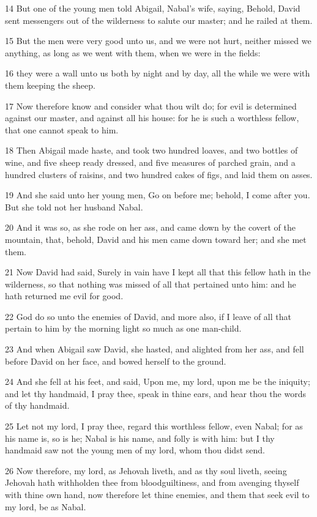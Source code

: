 \par 14 But one of the young men told Abigail, Nabal's wife, saying, Behold, David sent messengers out of the wilderness to salute our master; and he railed at them.
\par 15 But the men were very good unto us, and we were not hurt, neither missed we anything, as long as we went with them, when we were in the fields:
\par 16 they were a wall unto us both by night and by day, all the while we were with them keeping the sheep.
\par 17 Now therefore know and consider what thou wilt do; for evil is determined against our master, and against all his house: for he is such a worthless fellow, that one cannot speak to him.
\par 18 Then Abigail made haste, and took two hundred loaves, and two bottles of wine, and five sheep ready dressed, and five measures of parched grain, and a hundred clusters of raisins, and two hundred cakes of figs, and laid them on asses.
\par 19 And she said unto her young men, Go on before me; behold, I come after you. But she told not her husband Nabal.
\par 20 And it was so, as she rode on her ass, and came down by the covert of the mountain, that, behold, David and his men came down toward her; and she met them.
\par 21 Now David had said, Surely in vain have I kept all that this fellow hath in the wilderness, so that nothing was missed of all that pertained unto him: and he hath returned me evil for good.
\par 22 God do so unto the enemies of David, and more also, if I leave of all that pertain to him by the morning light so much as one man-child.
\par 23 And when Abigail saw David, she hasted, and alighted from her ass, and fell before David on her face, and bowed herself to the ground.
\par 24 And she fell at his feet, and said, Upon me, my lord, upon me be the iniquity; and let thy handmaid, I pray thee, speak in thine ears, and hear thou the words of thy handmaid.
\par 25 Let not my lord, I pray thee, regard this worthless fellow, even Nabal; for as his name is, so is he; Nabal is his name, and folly is with him: but I thy handmaid saw not the young men of my lord, whom thou didst send.
\par 26 Now therefore, my lord, as Jehovah liveth, and as thy soul liveth, seeing Jehovah hath withholden thee from bloodguiltiness, and from avenging thyself with thine own hand, now therefore let thine enemies, and them that seek evil to my lord, be as Nabal.
